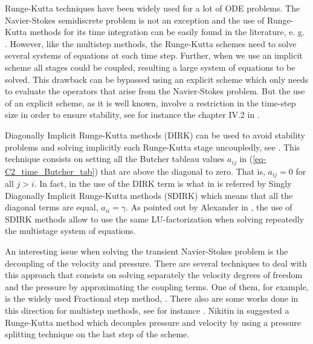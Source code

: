 Runge-Kutta techniques have been widely used for a lot of ODE problems. The Navier-Stokes semidiscrete problem is not an exception and the use of Runge-Kutta methods for its time integration can be easily found in the literature, e. g. \cite{nikitin_third-order-accurate_2006,sanderse_energy-conserving_2013,sanderse_accuracy_2012,sterner_semi-implicit_1997}. However, like the multistep methods, the Runge-Kutta schemes need to solve several systems of equations at each time step. Further, when we use an implicit scheme all stages could be coupled, resulting a large system of equations to be solved. This drawback can be bypassed using an explicit scheme which only needs to evaluate the operators that arise from the Navier-Stokes problem. But the use of an explicit scheme, as it is well known, involve a restriction in the time-step size in order to ensure stability, see for instance the chapter IV.2 in \cite{hairer_solving_1993}. 

Diagonally Implicit Runge-Kutta methods (DIRK) can be used to avoid stability problems and solving implicitly each Runge-Kutta stage uncoupledly, see \cite{alexander_diagonally_1977}. This technique consists on setting all the Butcher tableau values $a_{ij}$ in (\ref{eq-C2_time_Butcher_tab}) that are above the diagonal to zero. That is, $a_{ij} = 0$ for all $j>i$. In fact, in \cite{alexander_diagonally_1977} the use of the DIRK term is what in \cite{hairer_solving_1993} is referred by Singly Diagonally Implicit Runge-Kutta methods (SDIRK) which means that all the diagonal terms are equal, $a_{ii}=\gamma$. As pointed out by Alexander in \cite{alexander_diagonally_1977}, the use of SDIRK methods allow to use the same LU-factorization when solving repeatedly the multistage system of equations.

An interesting issue when solving the transient Navier-Stokes problem is the decoupling of the velocity and pressure. There are several techniques to deal with this approach that consists on solving separately the velocity degrees of freedom and the pressure by approximating the coupling terms. One of them, for example, is the widely used Fractional step method, \cite{donea_finite_1982}. There also are some works done in this direction for multistep methods, see for instance \cite{kim_application_1985}. Nikitin in \cite{nikitin_third-order-accurate_2006} suggested a Runge-Kutta method which decouples pressure and velocity by using a pressure splitting technique on the last step of the scheme.

